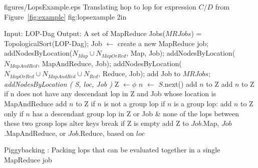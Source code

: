 \customizedfig
{figures/LopsExample.eps}
{Translating hop to lop for expression $C/D$ from Figure~\ref{fig:example}}
{fig:lopsexample}
{2in}

\begin{algorithm}
\begin{scriptsize}
\begin{algorithmic}[1]
\STATE Input:  LOP-Dag
\STATE Output: A set of MapReduce Jobs($MRJobs$)
 = TopologicalSort(LOP-Dag);
\STATE Job $\leftarrow$ create a new MapReduce job;
\STATE addNodesByLocation($N_{Map} \cup N_{MapOrRed}$, Map, Job);
\STATE addNodesByLocation($N_{MapAndRed}$, MapAndReduce, Job);
\STATE addNodesByLocation($N_{MapOrRed} \cup N_{MapAndRed} \cup N_{Red}$, Reduce, Job);
\STATE add Job to $MRJobs$;
\ENDWHILE
\STATE ~
 {\it addNodesByLocation ( S, loc, Job )}
\STATE  Z $\leftarrow \phi$
	\STATE $n$ $\leftarrow$ $S$.next()
			\STATE add $n$ to Z
			\STATE add $n$ to Z if n does not have any descendant lop in Z and Job whose location is MapAndReduce 
			\STATE add $n$ to Z if $n$ is not a group lop
			\STATE if $n$ is a group lop: add $n$ to Z only if $n$ has a descendant group lop in Z or Job \& none of the lops between these two group lops alter keys
		\ENDIF
	\ENDIF
\ENDWHILE
\STATE break if Z is empty
\STATE add Z to $Job$.Map, $Job$.MapAndReduce, or $Job$.Reduce, based on $loc$
\ENDWHILE
\end{algorithmic}
\caption{Piggybacking : Packing lops that can be evaluated together in a single MapReduce job}
\label{algo:piggybacking}
\end{scriptsize}
\end{algorithm}


